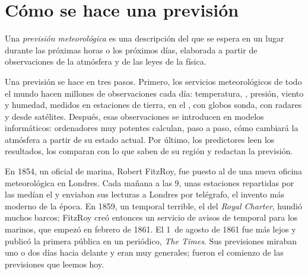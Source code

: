 \section{Cómo se hace una previsión}

\begin{definition}\label{def:g8:fronts-and-weather-maps:forecast}
Una \emph{previsión meteorológica}
es una descripción del  que se espera en un lugar durante las
próximas horas o los próximos días, elaborada a partir de observaciones de
la atmósfera y de las leyes de la física.
\end{definition}

Una previsión se hace en tres pasos. Primero, los servicios meteorológicos
de todo el mundo hacen millones de observaciones cada día: temperatura,
, presión, viento y humedad, medidos en estaciones de tierra,
en el , con globos sonda, con radares y desde satélites. Después, esas
observaciones se introducen en modelos informáticos: ordenadores muy
potentes calculan, paso a paso, cómo cambiará la atmósfera a partir de su
estado actual. Por último, los predictores leen los resultados, los
comparan con lo que saben de su región y redactan la previsión.

\begin{history}
En 1854, un oficial de marina, Robert FitzRoy, fue puesto al  de una
nueva oficina meteorológica en Londres. Cada mañana a las 9, unas
estaciones repartidas por las  medían el  y enviaban sus
lecturas a Londres por telégrafo, el invento más moderno de la época. En
1859, un temporal terrible, el del \emph{Royal Charter}, hundió muchos
barcos; FitzRoy creó entonces un servicio de avisos de temporal para los
marinos, que empezó en febrero de 1861. El 1~de agosto de 1861 fue más
lejos y publicó la primera  pública en un
periódico, \emph{The Times}. Sus previsiones miraban uno o dos días hacia
delante y eran muy generales; fueron el comienzo de las previsiones que
leemos hoy.
\end{history}

